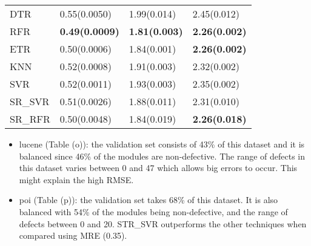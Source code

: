 \documentclass[]{article}
\begin{document}
\begin{table}[h]
\begin{adjustwidth}{-3.4cm}{}
\begin{subtable}{9.5cm}
\begin{tabular}{llll}
					DTR       & 0.55(0.0050) & 1.99(0.014) & 2.45(0.012) \\
					RFR       & \bfseries 0.49(0.0009) & \bfseries 1.81(0.003) & \bfseries 2.26(0.002) \\
					ETR       & 0.50(0.0006) & 1.84(0.001) & \bfseries 2.26(0.002) \\
					KNN       & 0.52(0.0008) & 1.91(0.003) & 2.32(0.002) \\
					SVR       & 0.52(0.0011) & 1.93(0.003) & 2.35(0.002) \\
					SR\_SVR    & 0.51(0.0026) & 1.88(0.011) & 2.31(0.010) \\
					SR\_RFR    & 0.50(0.0048) & 1.84(0.019) & \bfseries 2.26(0.018) \\ \hline
				\end{tabular}
			\end{subtable} 
		\end{adjustwidth}
	\end{table}
	\begin{itemize}
		\item lucene (Table (o)): the validation set consists of 43\% of this dataset and it is balanced since 46\% of the modules are non-defective. The range of defects in this dataset varies between 0 and 47 which allows big errors to occur. This might explain the high RMSE.
		\item poi (Table (p)): the validation set takes 68\% of this dataset. It is also balanced with 54\% of the modules being non-defective, and the range of defects between 0 and 20. STR\_SVR outperforms the other techniques when compared using MRE (0.35). 
	\end{itemize}
\end{document}
